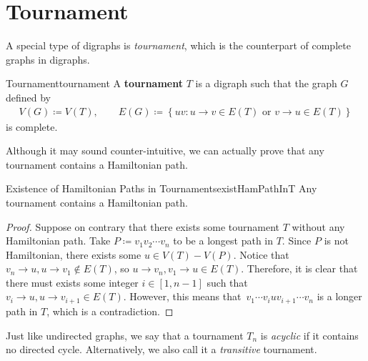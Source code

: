 \documentclass[math]{amznotes}
\theoremstyle{remark}
\begin{document}
\section{Tournament}
A special type of digraphs is \textit{tournament}, which is the counterpart of complete graphs in digraphs.
\begin{dfnbox}{Tournament}{tournament}
    A {\color{red} \textbf{tournament}} $T$ is a digraph such that the graph $G$ defined by 
    \begin{align*}
        V(G) \coloneqq V(T), \qquad E(G) \coloneqq \left\{uv \colon u \to v \in E(T) \textrm{ or } v \to u \in E(T)\right\}
    \end{align*}
    is complete.
\end{dfnbox}
Although it may sound counter-intuitive, we can actually prove that any tournament contains a Hamiltonian path.
\begin{probox}{Existence of Hamiltonian Paths in Tournaments}{existHamPathInT}
    Any tournament contains a Hamiltonian path.
    \tcblower
    \begin{proof}
        Suppose on contrary that there exists some tournament $T$ without any Hamiltonian path. Take $P \coloneqq v_1v_2\cdots v_n$ to be a longest path in $T$. Since $P$ is not Hamiltonian, there exists some $u \in V(T) - V(P)$. Notice that $v_n \to u, u \to v_1 \notin E(T)$, so $u \to v_n, v_1 \to u \in E(T)$. Therefore, it is clear that there must exists some integer $i \in [1, n - 1]$ such that $v_i \to u, u \to v_{i + 1} \in E(T)$. However, this means that~$v_1\cdots v_iuv_{i + 1}\cdots v_n$ is a longer path in $T$, which is a contradiction.
    \end{proof}
\end{probox}
Just like undirected graphs, we say that a tournament $T_n$ is \textit{acyclic} if it contains no directed cycle. Alternatively, we also call it a \textit{transitive} tournament.
\end{document}
